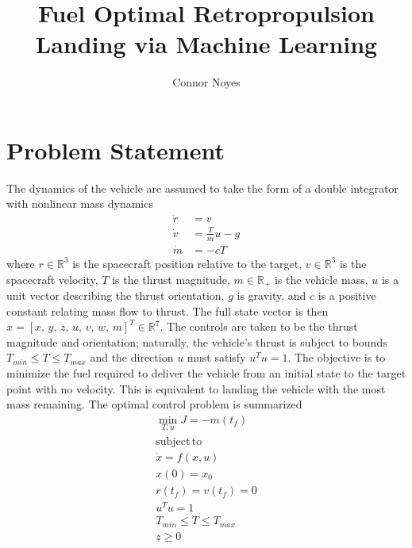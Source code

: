 \documentclass[10pt,a4paper]{article}
\author{Connor Noyes}
\title{Fuel Optimal Retropropulsion Landing via Machine Learning}
\begin{document}
	\maketitle
\section{Problem Statement}
The dynamics of the vehicle are assumed to take the form of a double integrator with nonlinear mass dynamics
\begin{align}
\dot{r} &= v \\
\dot{v} &= \frac{T}{m}u - g\\
\dot{m} &= -cT
\end{align}
where $r\in\mathbb{R}^3$ is the spacecraft position relative to the target, $v\in\mathbb{R}^3$ is the spacecraft velocity, $T$ is the thrust magnitude, $m\in\mathbb{R_+}$ is the vehicle mass, $u$ is a unit vector describing the thrust orientation, $g$ is gravity, and $c$ is a positive constant relating mass flow to thrust. The full state vector is then $x=[x,\,y,\,z,\,u,\,v,\,w,\,m]^T\in\mathbb{R}^7$. The controls are taken to be the thrust magnitude and orientation; naturally, the vehicle's thrust is subject to bounds $T_{min}\le T \le T_{max}$ and the direction $u$ must satisfy $u^Tu=1$. The objective is to minimize the fuel required to deliver the vehicle from an initial state to the target point with no velocity. This is equivalent to landing the vehicle with the most mass remaining. The optimal control problem is summarized
\begin{align}
\min_{T,u} J = -m(t_f) \\
\mathrm{subject\, to}\nonumber\\
\dot{x} = f(x,u) \\
x(0) = x_0 \\
r(t_f) = v(t_f) = 0 \\
u^Tu = 1 \\
T_{min}\le T \le T_{max} \\
z \ge 0 
\end{align}
\end{document}
